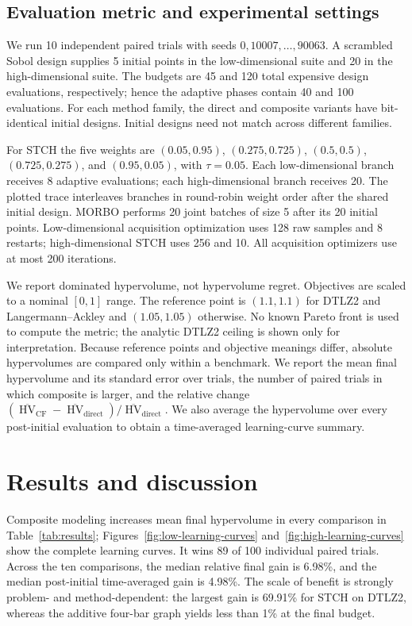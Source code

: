 \documentclass{article}
\newcommand{\HV}{\operatorname{HV}}
\newcommand{\cf}{\mathrm{CF}}
\newcommand{\direct}{\mathrm{direct}}
\begin{document}
\subsection{Evaluation metric and experimental settings}

We run 10 independent paired trials with seeds
$0,10007,\ldots,90063$.  A scrambled Sobol design supplies 5 initial points in
the low-dimensional suite and 20 in the high-dimensional suite.  The budgets
are 45 and 120 total expensive design evaluations, respectively; hence the
adaptive phases contain 40 and 100 evaluations.  For each method family, the
direct and composite variants have bit-identical initial designs.  Initial
designs need not match across different families.

For STCH the five weights are
$(0.05,0.95)$, $(0.275,0.725)$, $(0.5,0.5)$,
$(0.725,0.275)$, and $(0.95,0.05)$, with $\tau=0.05$.  Each low-dimensional
branch receives 8 adaptive evaluations; each high-dimensional branch receives
20.  The plotted trace interleaves branches in round-robin weight order after
the shared initial design.  MORBO performs 20 joint batches of size 5 after its
20 initial points.  Low-dimensional acquisition optimization uses 128 raw
samples and 8 restarts; high-dimensional STCH uses 256 and 10.  All acquisition
optimizers use at most 200 iterations.

We report dominated hypervolume, not hypervolume regret.  Objectives are scaled
to a nominal $[0,1]$ range.  The reference point is $(1.1,1.1)$ for DTLZ2 and
Langermann--Ackley and $(1.05,1.05)$ otherwise.  No known Pareto front is used
to compute the metric; the analytic DTLZ2 ceiling is shown only for
interpretation.  Because reference points and objective meanings differ,
absolute hypervolumes are compared only within a benchmark.  We report the
mean final hypervolume and its standard error over trials, the number of paired
trials in which composite is larger, and the relative change
$(\overline{\HV}_{\cf}-\overline{\HV}_{\direct})/
\overline{\HV}_{\direct}$.  We also average the hypervolume over every
post-initial evaluation to obtain a time-averaged learning-curve summary.

\section{Results and discussion}
\label{sec:results}

Composite modeling increases mean final hypervolume in every comparison in
Table~\ref{tab:results}; Figures~\ref{fig:low-learning-curves}
and~\ref{fig:high-learning-curves} show the complete learning curves.  It wins
89 of 100 individual paired trials.  Across
the ten comparisons, the median relative final gain is 6.98\%, and the median
post-initial time-averaged gain is 4.98\%.  The scale of benefit is strongly
problem- and method-dependent: the largest gain is 69.91\% for STCH on DTLZ2,
whereas the additive four-bar graph yields less than 1\% at the final budget.
\end{document}

